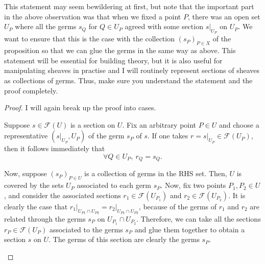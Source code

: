 This statement may seem bewildering at first, but note that the important
part in the above observation was that when we fixed a point $P$, there was
an open set $U_{P}$ where all the germs $s_{Q}$ for $Q\in U_{P}$ agreed
with some section $s\vert_{U_{P}}$ on $U_{P}$. We want to ensure that this is
the case with the collection $(s_{P})_{P\in X}$ of the proposition so that we
can glue the germs in the same way as above. This statement will be essential
for building theory, but it is also useful for manipulating sheaves in
practise and I will routinely represent sections of sheaves as collections
of germs. Thus, make sure you understand the statement and the proof
completely.
\begin{proof}
  I will again break up the proof into cases.

  \begin{description}[style=nextline]
    \item[$\subseteq\big)$]
          Suppose $s\in\mathscr{F}(U)$ is a section on $U$. Fix an arbitrary
          point $P\in U$ and choose a representative $(s\vert_{U_{P}}, U_{P})$
          of the germ $s_{P}$ of $s$. If one takes $r=s\vert_{U_{P}}\in
          \mathscr{F}(U_{P})$, then it follows immediately that
          \[\forall Q\in U_{P},\ r_{Q}=s_{Q}.\]
    \item[$\supseteq\big)$]
          Now, suppose $(s_{P})_{P\in U}$ is a collection of germs in the
          RHS set. Then, $U$ is covered by the sets $U_{P}$ associated to
          each germ $s_{P}$. Now, fix two points $P_{1},P_{2}\in U$,
          and consider the associated sections $r_{1}\in\mathscr{F}(U_{P_{1}})$
          and $r_{2}\in\mathscr{F}(U_{P_{2}})$. It is clearly the case that
          $r_{1}\vert_{U_{P1}\cap U_{P2}}=r_{2}\vert_{U_{P1}\cap U_{P2}}$, because
          of the germs of $r_{1}$ and $r_{2}$ are related through the germs
          $s_{P}$ on $U_{P_{1}}\cap U_{P_{2}}$. Therefore, we can take all
          the sections $r_{P}\in\mathscr{F}(U_{P})$ associated to the germs
          $s_{P}$ and glue them together to obtain a section $s$ on $U$.
          The germs of this section are clearly the germs $s_{P}$.
  \end{description}
\end{proof}

